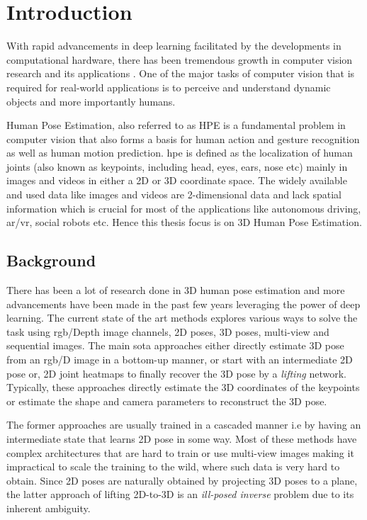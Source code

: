 \chapter{Introduction}
\label{chap:introduction}
With rapid advancements in deep learning facilitated by the developments in computational hardware, there has been tremendous growth in computer vision research and its applications \cite{AIandCompute}. One of the major tasks of computer vision that is required for real-world applications is to perceive and understand dynamic objects and more importantly humans.  

Human Pose Estimation, also referred to as HPE is a fundamental problem in computer vision that also forms a basis for human action and gesture recognition as well as human motion prediction. \ac{hpe} is defined as the localization of human joints (also known as keypoints, including head, eyes, ears, nose etc) mainly in images and videos in either a 2D or 3D coordinate space. The widely available and used data like images and videos are 2-dimensional data and lack spatial information which is crucial for most of the applications like autonomous driving, \ac{ar/vr}, social robots etc. Hence this thesis focus is on 3D Human Pose Estimation.

\section{Background}
\label{sec:background}

There has been a lot of research done in 3D human pose estimation and more advancements have been made in the past few years leveraging the power of deep learning. The current state of the art methods explores various ways to solve the task using \ac{rgb}/Depth image channels, 2D poses, 3D poses, multi-view and sequential images. The main \ac{sota} approaches either directly estimate 3D pose from an \ac{rgb}/D image in a bottom-up manner, or start with an intermediate 2D pose or, 2D joint heatmaps to finally recover the 3D pose by a \textit{lifting} network. Typically, these approaches directly estimate the 3D coordinates of the keypoints or estimate the shape and camera parameters to reconstruct the 3D pose.

The former approaches are usually trained in a cascaded manner i.e by having an intermediate state that learns 2D pose in some way. Most of these methods have complex architectures that are hard to train or use multi-view images making it impractical to scale the training to the wild, where such data is very hard to obtain. Since 2D poses are naturally obtained by projecting 3D poses to a plane, the latter approach of lifting 2D-to-3D is an \textit{ill-posed inverse} problem due to its inherent ambiguity. 

